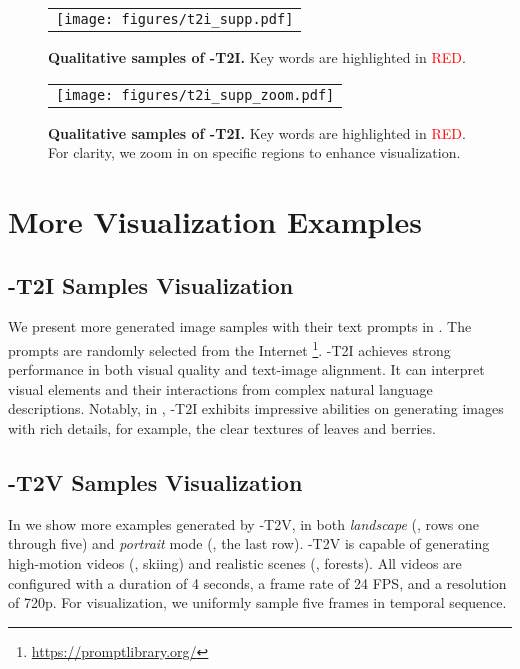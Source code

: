 \begin{figure}[ht]
\begin{center}
\begin{tabular}{c}
\texttt{[image: figures/t2i\_supp.pdf]} \\
\end{tabular}
\end{center}
\caption{\textbf{Qualitative samples of \ours-T2I.} Key words are highlighted in \textcolor{red}{RED}.}
\label{fig:t2i_supp}
\end{figure}


\begin{figure}[ht]
\begin{center}
\begin{tabular}{c}
\texttt{[image: figures/t2i\_supp\_zoom.pdf]} \\
\end{tabular}
\end{center}
\caption{\textbf{Qualitative samples of \ours-T2I.} Key words are highlighted in \textcolor{red}{RED}. For clarity, we zoom in on specific regions to enhance visualization.}
\label{fig:t2i_zoom_supp}
\end{figure}

\section{More Visualization Examples}
\subsection{\ours-T2I Samples Visualization}\label{sec:more-t2i-example}


We present more generated image samples with their text prompts in .  The prompts are randomly selected from the Internet \footnote{\url{https://promptlibrary.org/}}.  \ours-T2I achieves strong performance in both visual quality and text-image alignment. It can interpret visual elements and their interactions from complex natural language descriptions. Notably, in , \ours-T2I exhibits impressive abilities on generating images with rich details, for example, the clear textures of leaves and berries.


\subsection{\ours-T2V Samples Visualization}
In  we show more examples generated by \ours-T2V, in both \emph{landscape} (\eg, rows one through five) and \emph{portrait} mode (\eg, the last row). \ours-T2V is capable of generating high-motion videos (\eg, skiing) and realistic scenes (\eg, forests). All videos are configured with a duration of 4 seconds, a frame rate of 24 FPS, and a resolution of 720p. For visualization, we uniformly sample five frames in temporal sequence.


